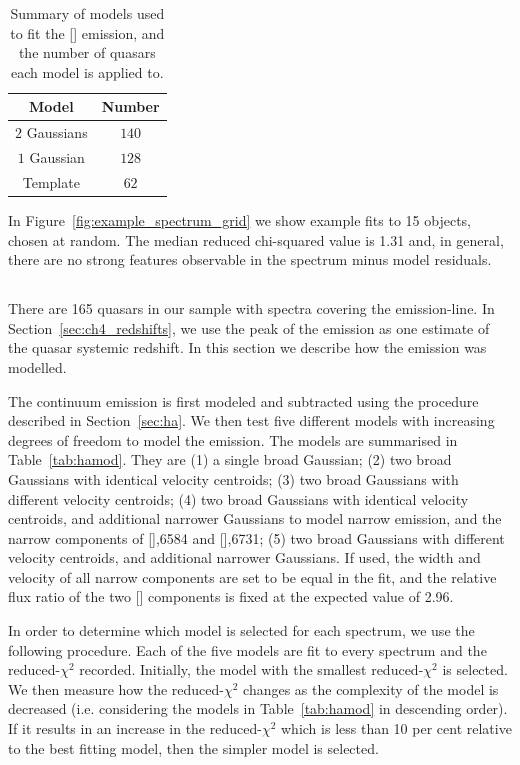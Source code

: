 \begin{table}
  \centering
  \footnotesize 
  \caption{Summary of models used to fit the [] emission, and the number of quasars each model is applied to.}
  \label{tab:oiiimod}
    \begin{tabular}{cc} 
    \hline
    Model & Number \\
    \hline
    $2$ Gaussians &  $140$ \\
    $1$ Gaussian  &  $128$ \\
    Template &  $62$ \\
    \hline
    \end{tabular}
\end{table} 

In Figure~\ref{fig:example_spectrum_grid} we show example fits to 15 objects, chosen at random. 
The median reduced chi-squared value is 1.31 and, in general, there are no strong features observable in the spectrum minus model residuals.

\subsection{\hans}
\label{sec:hamodel}

There are 165 quasars in our sample with spectra covering the \ha emission-line. 
In Section~\ref{sec:ch4_redshifts}, we use the peak of the \ha emission as one estimate of the quasar systemic redshift. 
In this section we describe how the \ha emission was modelled. 

The continuum emission is first modeled and subtracted using the procedure described in Section~\ref{sec:ha}. 
We then test five different models with increasing degrees of freedom to model the \ha emission. 
The models are summarised in Table~\ref{tab:hamod}. 
They are (1) a single broad Gaussian; (2) two broad Gaussians with identical velocity centroids; (3) two broad Gaussians with different velocity centroids; (4) two broad Gaussians with identical velocity centroids, and additional narrower Gaussians to model narrow \ha emission, and the narrow components of [],6584 and [],6731; (5) two broad Gaussians with different velocity centroids, and additional narrower Gaussians. 
If used, the width and velocity of all narrow components are set to be equal in the fit, and the relative flux ratio of the two [] components is fixed at the expected value of 2.96.

In order to determine which model is selected for each spectrum, we use the following procedure.  
Each of the five models are fit to every spectrum and the reduced-$\chi^2$ recorded.
Initially, the model with the smallest reduced-$\chi^2$ is selected. 
We then measure how the reduced-$\chi^2$ changes as the complexity of the model is decreased (i.e. considering the models in Table~\ref{tab:hamod} in descending order). 
If it results in an increase in the reduced-$\chi^2$ which is less than 10 per cent relative to the best fitting model, then the simpler model is selected.  


